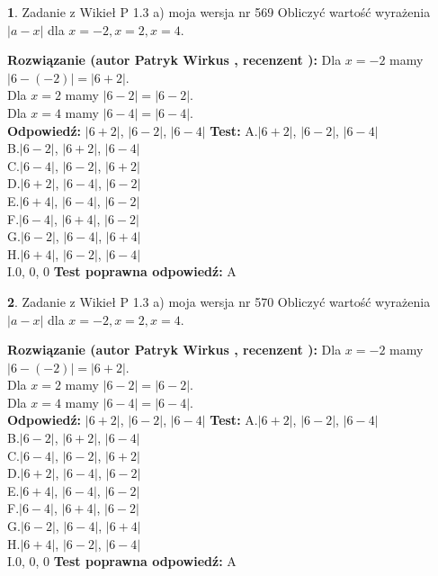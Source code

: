 \documentclass[12pt, a4paper]{article}
\theoremstyle{definition} %
\newtheorem{zad}{}
\newcommand{\zadStart}[1]{\begin{zad}#1\newline}
\newcommand{\zadStop}{\end{zad}}
\newcommand{\rozwStart}[2]{\noindent \textbf{Rozwiązanie (autor #1 , recenzent #2): }\newline}
\newcommand{\rozwStop}{\newline}
\newcommand{\odpStart}{\noindent \textbf{Odpowiedź:}\newline}
\newcommand{\odpStop}{\newline}
\newcommand{\testStart}{\noindent \textbf{Test:}\newline}
\newcommand{\testStop}{\newline}
\newcommand{\kluczStart}{\noindent \textbf{Test poprawna odpowiedź:}\newline}
\newcommand{\kluczStop}{\newline}
\begin{document}
\zadStart{Zadanie z Wikieł P 1.3 a) moja wersja nr 569}
Obliczyć wartość wyrażenia $|a - x|$ dla $x=-2,x=2,x=4$.
\zadStop
\rozwStart{Patryk Wirkus}{}
Dla $x = -2$ mamy $|6 - (-2)| = |6 + 2|$.\\
Dla $x = 2$ mamy $|6 - 2| = |6 - 2|$.\\
Dla $x = 4$ mamy $|6 - 4| = |6 - 4|$.\\
\rozwStop
\odpStart
$|6 + 2|$, $|6 - 2|$, $|6 - 4|$
\odpStop
\testStart
A.$|6 + 2|$, $|6 - 2|$, $|6 - 4|$\\
B.$|6 - 2|$, $|6 + 2|$, $|6 - 4|$\\
C.$|6 - 4|$, $|6 - 2|$, $|6 + 2|$\\
D.$|6 + 2|$, $|6 - 4|$, $|6 - 2|$\\
E.$|6 + 4|$, $|6 - 4|$, $|6 - 2|$\\
F.$|6 - 4|$, $|6 + 4|$, $|6 - 2|$\\
G.$|6 - 2|$, $|6 - 4|$, $|6 + 4|$\\
H.$|6 + 4|$, $|6 - 2|$, $|6 - 4|$\\
I.$0$, $0$, $0$
\testStop
\kluczStart
A
\kluczStop



\zadStart{Zadanie z Wikieł P 1.3 a) moja wersja nr 570}
Obliczyć wartość wyrażenia $|a - x|$ dla $x=-2,x=2,x=4$.
\zadStop
\rozwStart{Patryk Wirkus}{}
Dla $x = -2$ mamy $|6 - (-2)| = |6 + 2|$.\\
Dla $x = 2$ mamy $|6 - 2| = |6 - 2|$.\\
Dla $x = 4$ mamy $|6 - 4| = |6 - 4|$.\\
\rozwStop
\odpStart
$|6 + 2|$, $|6 - 2|$, $|6 - 4|$
\odpStop
\testStart
A.$|6 + 2|$, $|6 - 2|$, $|6 - 4|$\\
B.$|6 - 2|$, $|6 + 2|$, $|6 - 4|$\\
C.$|6 - 4|$, $|6 - 2|$, $|6 + 2|$\\
D.$|6 + 2|$, $|6 - 4|$, $|6 - 2|$\\
E.$|6 + 4|$, $|6 - 4|$, $|6 - 2|$\\
F.$|6 - 4|$, $|6 + 4|$, $|6 - 2|$\\
G.$|6 - 2|$, $|6 - 4|$, $|6 + 4|$\\
H.$|6 + 4|$, $|6 - 2|$, $|6 - 4|$\\
I.$0$, $0$, $0$
\testStop
\kluczStart
A
\kluczStop
\end{document}
